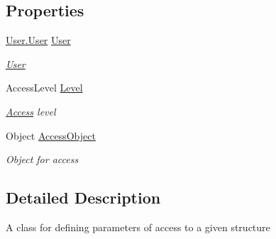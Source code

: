 \subsection*{Properties}
\begin{DoxyCompactItemize}
\item 
\hyperlink{class_dwarf_d_b_1_1_user_1_1_user}{User.\+User} \hyperlink{class_dwarf_d_b_1_1_access_1_1_access_a2ce47e616d244725b801e6c86b87e54a}{User}
\begin{DoxyCompactList}\small\item\em \hyperlink{namespace_dwarf_d_b_1_1_user}{User} \end{DoxyCompactList}\item 
Access\+Level \hyperlink{class_dwarf_d_b_1_1_access_1_1_access_ae25a83ec0bbcaa858dd5dbac88ac7e1b}{Level}
\begin{DoxyCompactList}\small\item\em \hyperlink{class_dwarf_d_b_1_1_access_1_1_access}{Access} level \end{DoxyCompactList}\item 
Object \hyperlink{class_dwarf_d_b_1_1_access_1_1_access_aa37746be2be0e6be094ea08fa8aaa705}{Access\+Object}
\begin{DoxyCompactList}\small\item\em Object for access \end{DoxyCompactList}\end{DoxyCompactItemize}


\subsection{Detailed Description}
A class for defining parameters of access to a given structure 



